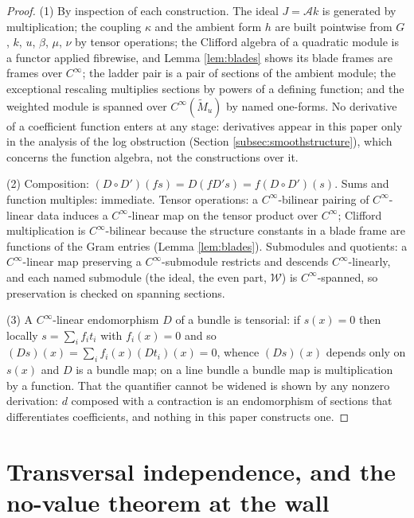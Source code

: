 \documentclass[11pt]{article}
\theoremstyle{definition}
\newcommand{\shA}{\mathcal{A}}
\newcommand{\shW}{\mathcal{W}}
\newcommand{\Mt}{\widetilde{M}}
\begin{document}
\begin{proof}
(1) By inspection of each construction. The ideal $J = \shA k$ is generated by multiplication; the coupling $\kappa$ and the ambient form $h$ are built pointwise from $G$, $k$, $u$, $\beta$, $\mu$, $\nu$ by tensor operations; the Clifford algebra of a quadratic module is a functor applied fibrewise, and Lemma \ref{lem:blades} shows its blade frames are frames over $C^\infty$; the ladder pair is a pair of sections of the ambient module; the exceptional rescaling multiplies sections by powers of a defining function; and the weighted module is spanned over $C^\infty(\Mt_u)$ by named one-forms. No derivative of a coefficient function enters at any stage: derivatives appear in this paper only in the analysis of the log obstruction (Section \ref{subsec:smoothstructure}), which concerns the function algebra, not the constructions over it.

(2) Composition: $(D \circ D')(fs) = D(fD's) = f(D \circ D')(s)$. Sums and function multiples: immediate. Tensor operations: a $C^\infty$-bilinear pairing of $C^\infty$-linear data induces a $C^\infty$-linear map on the tensor product over $C^\infty$; Clifford multiplication is $C^\infty$-bilinear because the structure constants in a blade frame are functions of the Gram entries (Lemma \ref{lem:blades}). Submodules and quotients: a $C^\infty$-linear map preserving a $C^\infty$-submodule restricts and descends $C^\infty$-linearly, and each named submodule (the ideal, the even part, $\shW$) is $C^\infty$-spanned, so preservation is checked on spanning sections.

(3) A $C^\infty$-linear endomorphism $D$ of a bundle is tensorial: if $s(x) = 0$ then locally $s = \sum_i f_i t_i$ with $f_i(x) = 0$ and so $(Ds)(x) = \sum_i f_i(x)(Dt_i)(x) = 0$, whence $(Ds)(x)$ depends only on $s(x)$ and $D$ is a bundle map; on a line bundle a bundle map is multiplication by a function. That the quantifier cannot be widened is shown by any nonzero derivation: $d$ composed with a contraction is an endomorphism of sections that differentiates coefficients, and nothing in this paper constructs one.
\end{proof}

\section{Transversal independence, and the no-value theorem at the wall}\label{sec:transversal}
\end{document}

